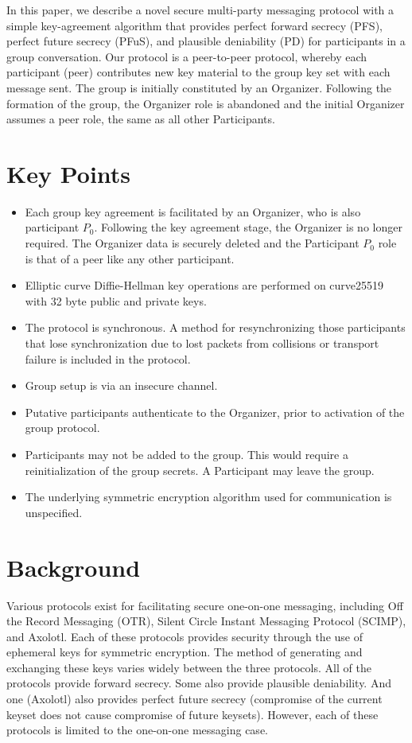 \documentclass[%
preprint,
amsmath,amssymb,
aps,
prb,
floatfix,
]{revtex4-1}
\begin{document}
In this paper, we describe a novel secure multi-party messaging protocol with a
simple key-agreement algorithm that provides perfect forward secrecy (PFS),
perfect future secrecy (PFuS),
and plausible deniability (PD) for participants in a group conversation. Our protocol
is a peer-to-peer protocol, whereby each
participant (peer) contributes new
key material to the group key set with each message sent. The group is
initially constituted by an Organizer. Following the formation of the group, the
Organizer role is abandoned and the initial Organizer assumes a peer role, the
same as all other Participants.

\section{\label{sec:keypoints}Key Points}
\begin{itemize}
\item Each group key agreement is facilitated by an Organizer, who is also
participant $P_0$. Following the key agreement stage, the Organizer is no longer
required. The Organizer data is securely deleted and the Participant
$P_0$ role is that of a peer like any other
participant.
\item Elliptic curve Diffie-Hellman key operations are performed on curve25519
with 32 byte
public and private keys.
\item The protocol is synchronous. A method for resynchronizing those
participants that lose synchronization due to lost packets from collisions or
transport failure is included in the protocol.
\item Group setup is via an insecure channel.
\item Putative participants authenticate to the Organizer, prior to
activation of the group protocol.
\item Participants may not be added to the group. This would
require a reinitialization of the group secrets. A Participant may leave the
group.
\item The underlying symmetric encryption algorithm used for communication is
unspecified.
\end{itemize}

\section{\label{sec:background}Background}
Various protocols exist for facilitating secure one-on-one messaging, including
Off the Record Messaging (OTR)\cite{ref:otr1,ref:raimondo,ref:otr2,ref:otr3,ref:otr}, Silent Circle Instant Messaging Protocol
(SCIMP)\cite{ref:scimp}, and Axolotl\cite{ref:axolotl}. Each of these protocols
provides security through the use of ephemeral keys for symmetric encryption.
The method of generating and exchanging these keys varies widely between the
three protocols. All of the protocols provide forward
secrecy. Some also provide plausible deniability. And one (Axolotl) also
provides perfect future secrecy (compromise of the current keyset does not cause
compromise of future keysets). However, each of these protocols is limited to
the one-on-one messaging case.
\end{document}
